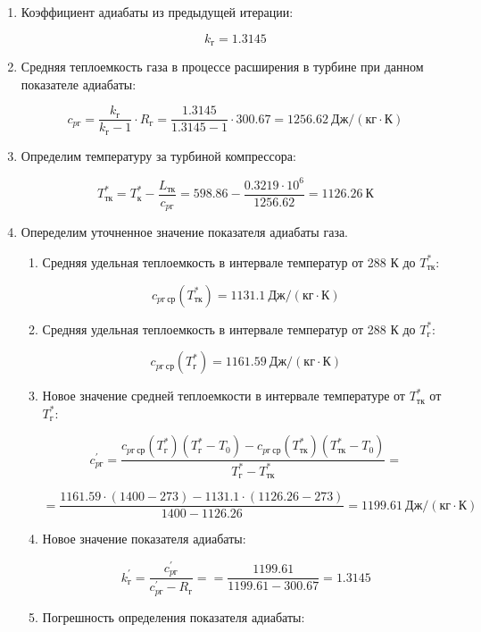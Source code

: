 \documentclass[a4paper,10pt]{article}
\begin{document}
\begin{enumerate}
	\item Коэффициент адиабаты из предыдущей итерации:
	
	\[
	k_г = 1.3145
	\]
	
	\item Средняя теплоемкость газа в процессе расширения в турбине при данном показателе адиабаты:
	
	\[
	c_{pг} = \frac{ k_г }{ k_г - 1 } \cdot R_г = 
			\frac{ 1.3145 }{ 1.3145 - 1 } \cdot 300.67 = 
			1256.62\ Дж / (кг \cdot К)
	\]
	
	\item Определим температуру за турбиной компрессора:
	
	\[
	T_{тк}^* = T_к^* - \frac{ L_{тк} }{ c_{pг} } = 
			598.86 - \frac{ 0.3219 \cdot 10^6  }{ 1256.62 } = 
			1126.26\ К
	\]
	
	\item Опеределим уточненное значение показателя адиабаты газа.
	
	\begin{enumerate}
	
		\item Средняя удельная теплоемкость в интервале температур от 288 К до $ T_{тк}^* $:
		
		\[
		c_{pг\ ср} (T_{тк}^*) = 1131.1\ Дж / (кг \cdot К)
		\]
		
		\item Средняя удельная теплоемкость в интервале температур от 288 К до $ T_{г}^* $:
		
		\[
		c_{pг\ ср} (T_{г}^*) = 1161.59\ Дж / (кг \cdot К)
		\]
		
		\item Новое значение средней теплоемкости в интервале температуре от $ T_{тк}^* $ от $ T_{г}^* $:
		
		\[c_{pг}^\prime = \frac{
		c_{pг\ ср}(T_г^*) (T_г^* - T_0) - c_{pг\ ср}(T_{тк}^*) (T_{тк}^* - T_0)
		}{
		T_г^* - T_{тк}^*} = \]
		
		\[ =\frac{
		1161.59 \cdot (1400 - 273) - 
		1131.1 \cdot (1126.26 - 273)
		}{
		1400 - 1126.26} = 
		1199.61 \ Дж / (кг \cdot К)
		\]
		
		\item Новое значение показателя адиабаты:
		
		\[
		k_{г}^\prime = \frac{ c_{pг}^\prime }{ c_{pг}^\prime - R_г } = 
				= \frac{ 1199.61 }{ 1199.61 - 300.67 } =
				1.3145
		\]
		
		\item Погрешность определения показателя адиабаты:
		

\end{enumerate}
\end{enumerate}
\end{document}
